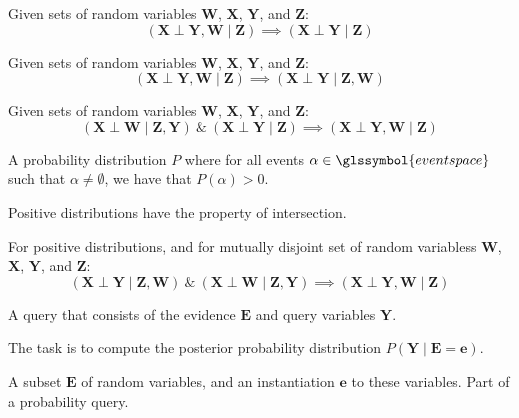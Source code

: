{%
  Given sets of random variables $\bm{W}$, $\bm{X}$, $\bm{Y}$, and $\bm{Z}$:
  \begin{equation*}
    (\bm{X}\perp\bm{Y},\bm{W}\mid\bm{Z})\implies(\bm{X}\perp\bm{Y}\mid\bm{Z})
  \end{equation*}
}

{%
  Given sets of random variables $\bm{W}$, $\bm{X}$, $\bm{Y}$, and $\bm{Z}$:
  \begin{equation*}
    (\bm{X}\perp\bm{Y},\bm{W}\mid \bm{Z})\implies(\bm{X}\perp\bm{Y}\mid\bm{Z},\bm{W})
  \end{equation*}
}

{%
  Given sets of random variables $\bm{W}$, $\bm{X}$, $\bm{Y}$, and $\bm{Z}$:
  \begin{equation*}
    (\bm{X}\perp\bm{W}\mid\bm{Z},\bm{Y})~\&~(\bm{X}\perp\bm{Y}\mid\bm{Z})\implies(\bm{X}\perp\bm{Y},\bm{W}\mid\bm{Z})
  \end{equation*}
}

{%
  A \gls{probability distribution} $P$ where for all events $\alpha\in\glssymbol{event space}$ such that $\alpha\neq\emptyset$, we have that $P(\alpha)>0$.

  Positive distributions have the property of \gls{intersection}.
}

{%
  For \glspl{positive distribution}, and for mutually disjoint \glspl{set of random variables} $\bm{W}$, $\bm{X}$, $\bm{Y}$, and $\bm{Z}$:
  \begin{equation*}
    (\bm{X}\perp\bm{Y}\mid\bm{Z},\bm{W})~\&~(\bm{X}\perp\bm{W}\mid\bm{Z},\bm{Y})\implies(\bm{X}\perp\bm{Y},\bm{W}\mid\bm{Z})
  \end{equation*}
}

{%
  A query that consists of the \gls{evidence} $\bm{E}$ and \gls{query variables} $\bm{Y}$.

  The task is to compute the \gls{posterior probability distribution} $P(\bm{Y}\mid\bm{E}=\bm{e})$.
}

{%
}


{%
  A subset $\bm{E}$ of \glspl{random variable}, and an instantiation $\bm{e}$ to these variables. Part of a \gls{probability query}.
}


